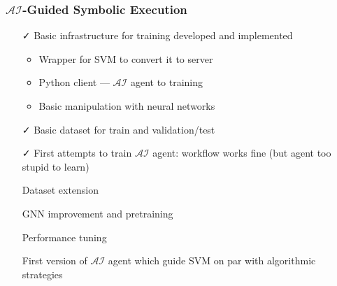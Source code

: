 \documentclass[xcolor=table,aspectratio=169]{beamer}
\begin{document}
\begin{frame}[fragile]
  \frametitle{$\mathcal{AI}$-Guided Symbolic Execution}  
  
  \begin{itemize}
    \item[\faCheck] Basic infrastructure for training developed and implemented
      \begin{itemize}
        \item Wrapper for SVM to convert it to server
        \item Python client --- $\mathcal{AI}$ agent to training
        \item Basic manipulation with neural networks 
      \end{itemize}
    \item[\faCheck] Basic dataset for train and validation/test
    \item[\faCheck] First attempts to train $\mathcal{AI}$ agent: workflow works fine (but agent too stupid to learn) 
    \item[\faGears] Dataset extension
    \item[\faGears] GNN improvement and pretraining 
    \item[\faGears] Performance tuning 
    \item[\faHourglassHalf] First version of $\mathcal{AI}$ agent which guide SVM on par with algorithmic strategies
  \end{itemize}
\end{frame}
\end{document}
